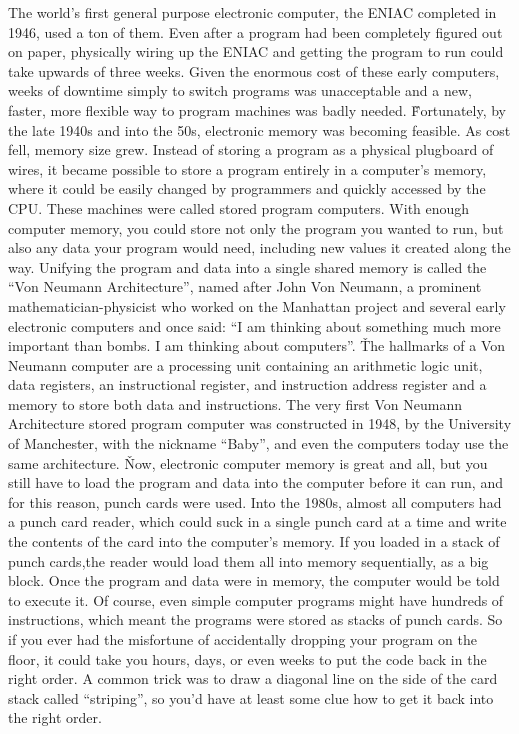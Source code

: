 The world's first general purpose electronic computer, the ENIAC completed in 1946, used a ton of them. Even after a
program had been completely figured out on paper, physically wiring up the ENIAC and getting the program to run could
take upwards of three weeks. Given the enormous cost of these early computers, weeks of downtime simply to switch
programs was unacceptable and a new, faster, more flexible way to program machines was badly needed. \v

Fortunately, by the late 1940s and into the 50s, electronic memory was becoming feasible. As cost fell, memory size
grew. Instead of storing a program as a physical plugboard of wires, it became possible to store a program entirely
in a computer's memory, where it could be easily changed by programmers and quickly accessed by the CPU. These
machines were called stored program computers. With enough computer memory, you could store not only the program you
wanted to run, but also any data your program would need, including new values it created along the way. Unifying the
program and data into a single shared memory is called the ``Von Neumann Architecture'', named after John Von
Neumann, a prominent mathematician-physicist who worked on the Manhattan project and several early electronic
computers and once said: ``I am thinking about something much more important than bombs. I am thinking about
computers''. \v

The hallmarks of a Von Neumann computer are a processing unit containing an arithmetic logic unit, data registers, an
instructional register, and instruction address register and a memory to store both data and instructions. The very
first Von Neumann Architecture stored program computer was constructed in 1948, by the University of Manchester, with
the nickname ``Baby'', and even the computers today use the same architecture. \v

Now, electronic computer memory is great and all, but you still have to load the program and data into the computer
before it can run, and for this reason, punch cards were used. Into the 1980s, almost all computers had a punch card
reader, which could suck in a single punch card at a time and write the contents of the card into the computer's
memory. If you loaded in a stack of punch cards,the reader would load them all into memory sequentially, as a big
block. Once the program and data were in memory,  the computer would be told to execute it. Of course, even simple
computer programs might have hundreds of instructions, which meant the programs were stored as stacks of punch cards.
So if you ever had the misfortune of accidentally dropping your program on the floor, it could take you hours, days,
or even weeks to put the code back in the right order. A common trick was to draw a diagonal line on the side of the
card stack called ``striping'', so you'd have at least some clue how to get it back into the right order.

